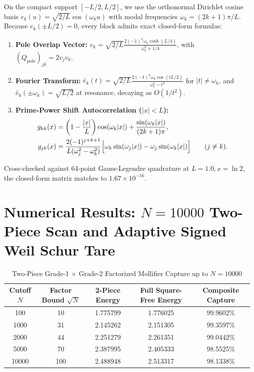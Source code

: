 \documentclass[11pt,a4paper]{article}
\begin{document}
On the compact support $[-L/2, L/2]$, we use the orthonormal Dirichlet cosine basis $e_k(u) = \sqrt{2/L}\cos(\omega_k u)$ with modal frequencies $\omega_k = (2k+1)\pi/L$. Because $e_k(\pm L/2) = 0$, every block admits exact closed-form formulas:
\begin{enumerate}
  \item \textbf{Pole Overlap Vector:} $v_k = \sqrt{2/L} \frac{2(-1)^k \omega_k \cosh(L/4)}{\omega_k^2 + 1/4}$, with $(Q_{\mathrm{pole}})_{jk} = 2 v_j v_k$.
  \item \textbf{Fourier Transform:} $\widehat{e}_k(t) = \sqrt{2/L} \frac{2(-1)^k \omega_k \cos(tL/2)}{\omega_k^2 - t^2}$ for $|t| \neq \omega_k$, and $\widehat{e}_k(\pm\omega_k) = \sqrt{L/2}$ at resonance, decaying as $O(1/t^2)$.
  \item \textbf{Prime-Power Shift Autocorrelation ($|x| < L$):}
  \begin{align*}
    g_{kk}(x) &= \left(1 - \frac{|x|}{L}\right)\cos(\omega_k |x|) + \frac{\sin(\omega_k |x|)}{(2k+1)\pi}, \\
    g_{jk}(x) &= \frac{2(-1)^{j+k+1}}{L(\omega_j^2 - \omega_k^2)}\Bigl[\omega_k \sin(\omega_j |x|) - \omega_j \sin(\omega_k |x|)\Bigr] \qquad (j \neq k).
  \end{align*}
\end{enumerate}
Cross-checked against 64-point Gauss-Legendre quadrature at $L = 1.0, x = \ln 2$, the closed-form matrix matches to $1.67 \times 10^{-16}$.

\section{Numerical Results: $N = 10000$ Two-Piece Scan and Adaptive Signed Weil Schur Tare}

\begin{table}[htbp]
\centering
\caption{Two-Piece Grade-1 $\times$ Grade-2 Factorized Mollifier Capture up to $N = 10000$}
\begin{tabular}{ccccc}
\toprule
Cutoff $N$ & Factor Bound $\sqrt{N}$ & 2-Piece Energy & Full Square-Free Energy & Composite Capture \\
\midrule
100 & 10 & 1.775799 & 1.776025 & 99.9602\% \\
1000 & 31 & 2.145262 & 2.151305 & 99.3597\% \\
2000 & 44 & 2.251279 & 2.261351 & 99.0442\% \\
5000 & 70 & 2.387995 & 2.405333 & 98.5525\% \\
10000 & 100 & 2.488948 & 2.513317 & 98.1338\% \\
\bottomrule
\end{tabular}
\end{table}
\end{document}
